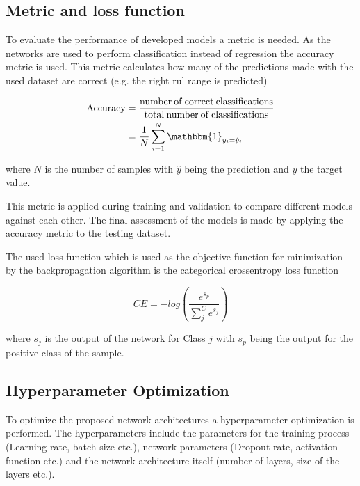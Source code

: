 \documentclass[conference]{IEEEtran}
\begin{document}
\subsection{Metric and loss function}
\label{sec:metric_and_loss_function}

To evaluate the performance of developed models a metric is needed. As the networks are used to perform classification instead of regression the accuracy metric is used. This metric calculates how many of the predictions made with the used dataset are correct (e.g. the right \gls{rul} range is predicted)

\begin{equation}
	\label{eq:accuracy_metric}
	\begin{split}
		\begin{aligned}
			\mathrm{Accuracy} & = \frac{\mathrm{number\:of\:correct\:classifications}}{\mathrm{total\:number\:of\:classifications}} \\
			& = \frac{1}{N}\sum_{i=1}^N \mathbbm{1}_{y_i = \hat{y}_i}
		\end{aligned}
	\end{split}
\end{equation}

where $ N $ is the number of samples with $ \hat{y} $ being the prediction and $ y $ the target value.

This metric is applied during training and validation to compare different models against each other. The final assessment of the models is made by applying the accuracy metric to the testing dataset.

The used loss function which is used as the objective function for minimization by the backpropagation algorithm is the categorical crossentropy loss function

\begin{equation}
	\label{eq:categorical-cross-entrophy}
	CE = -log(\frac{e^{s_p}}{\sum_{j}^{C} e^{s_j}})	
\end{equation}

where $ s_j $ is the output of the network for Class $ j $ with $ s_p $ being the output for the positive class of the sample.

\subsection{Hyperparameter Optimization}
\label{sec:hyperparameter_optimization_method}

To optimize the proposed network architectures a hyperparameter optimization is performed. The hyperparameters include the parameters for the training process (Learning rate, batch size etc.), network parameters (Dropout rate, activation function etc.) and the network architecture itself (number of layers, size of the layers etc.).
\end{document}
